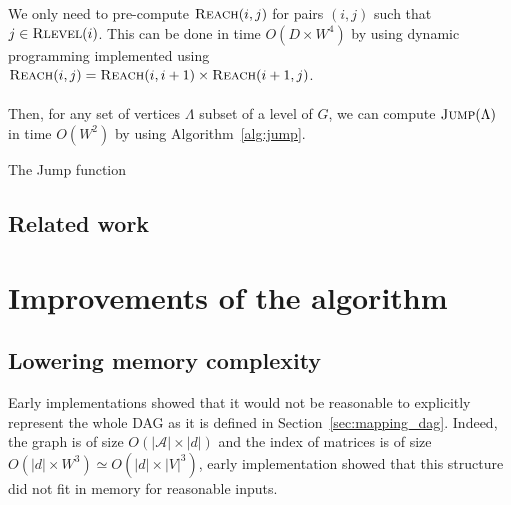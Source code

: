 \documentclass[11px]{article}
\theoremstyle{definition}
\begin{document}
          We only need to pre-compute $\Call{Reach}{i, j}$ for pairs $(i, j)$
          such that $j \in \Call{Rlevel}{i}$. This can be done in time $O(D
          \times W^{4})$ by using dynamic programming implemented using
          $\Call{Reach}{i, j} = \Call{Reach}{i, i+1} \times \Call{Reach}{i+1,
          j}$.

        \paragraph{} Then, for any set of vertices $\Lambda$ subset of a level
        of $G$, we can compute $\Call{Jump}{\Lambda}$ in time $O(W^2)$ by using
        Algorithm~\ref{alg:jump}.

        \begin{algorithm}[H]
          \caption{The Jump function}%
          \label{alg:jump}
          \begin{algorithmic}[1]
                \State{\Return{$\Lambda$}}
              \Else{}
              \EndIf{}
            \EndFunction{}
          \end{algorithmic}
        \end{algorithm}

    \subsection{Related work}


  \section{Improvements of the algorithm}

    \subsection{Lowering memory complexity}

      Early implementations showed that it would not be reasonable to
      explicitly represent the whole DAG as it is defined in
      Section~\ref{sec:mapping_dag}. Indeed, the graph is of size
      $O(|\mathcal{A}| \times |d|)$ and the index of matrices 
      is of size $O(|d| \times W^3) \simeq O(|d| \times |V|^3)$, early
      implementation showed that this structure did not fit in memory for
      reasonable inputs.
\end{document}
